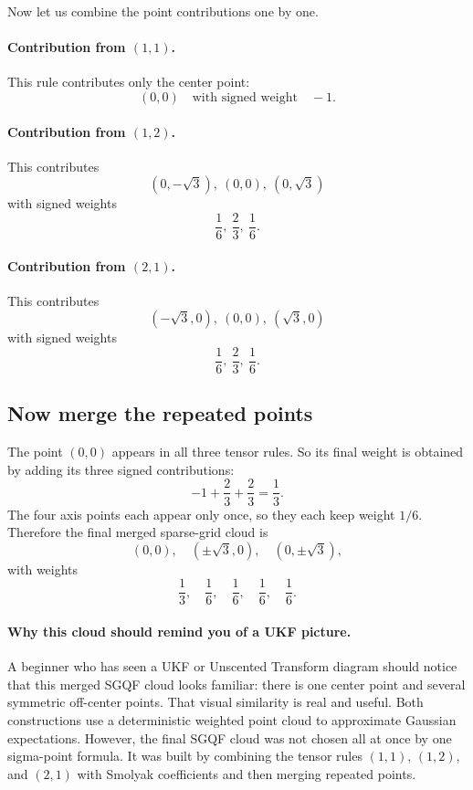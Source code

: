 \documentclass[11pt]{article}
\begin{document}
Now let us combine the point contributions one by one.

\paragraph{Contribution from \texorpdfstring{\((1,1)\)}{(1,1)}.}
This rule contributes only the center point:
\[
  (0,0) \quad\text{with signed weight}\quad -1.
\]

\paragraph{Contribution from \texorpdfstring{\((1,2)\)}{(1,2)}.}
This contributes
\[
  (0,-\sqrt3),\ (0,0),\ (0,\sqrt3)
\]
with signed weights
\[
  \frac16,\ \frac23,\ \frac16.
\]

\paragraph{Contribution from \texorpdfstring{\((2,1)\)}{(2,1)}.}
This contributes
\[
  (-\sqrt3,0),\ (0,0),\ (\sqrt3,0)
\]
with signed weights
\[
  \frac16,\ \frac23,\ \frac16.
\]

\subsection{Now merge the repeated points}

The point \((0,0)\) appears in all three tensor rules.  So its final weight is
obtained by adding its three signed contributions:
\begin{equation}
  -1+\frac23+\frac23=\frac13.
  \label{eq:center-weight-2d}
\end{equation}
The four axis points each appear only once, so they each keep weight \(1/6\).
Therefore the final merged sparse-grid cloud is
\begin{equation}
  (0,0),\quad (\pm\sqrt3,0),\quad (0,\pm\sqrt3),
  \label{eq:five-point-cloud}
\end{equation}
with weights
\begin{equation}
  \frac13,\quad \frac16,\quad \frac16,\quad \frac16,\quad \frac16.
  \label{eq:five-point-weights}
\end{equation}

\paragraph{Why this cloud should remind you of a UKF picture.}
A beginner who has seen a UKF or Unscented Transform diagram should notice that
this merged SGQF cloud looks familiar: there is one center point and several
symmetric off-center points.  That visual similarity is real and useful.  Both
constructions use a deterministic weighted point cloud to approximate Gaussian
expectations.  However, the final SGQF cloud was not chosen all at once by one
sigma-point formula.  It was built by combining the tensor rules \((1,1)\),
\((1,2)\), and \((2,1)\) with Smolyak coefficients and then merging repeated
points.
\end{document}
